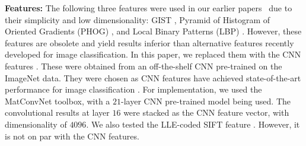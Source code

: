 









\textbf{Features:} The following three features were used in our
earlier papers~\citep{dai:eccv12b, dai:iccv13b} due to their simplicity and low dimensionality: GIST
\citep{gist}, Pyramid of Histogram of Oriented Gradients (PHOG)
\citep{Bosch:iccv07}, and Local Binary Patterns (LBP)
\citep{Ojala02}. However, these features are obsolete and yield
 results inferior than alternative features recently developed  for image
classification. 
In this paper, we replaced them with the CNN features \citep{caffe14, deep:bmvc14}. 
These were obtained from an off-the-shelf CNN pre-trained on the ImageNet data. 
They were chosen as CNN features
have achieved state-of-the-art performance for image classification
\citep{nips12:cnn, cnnfet14}. For implementation, we used the
MatConvNet \citep{MatConvNet} toolbox, with a $21$-layer CNN
pre-trained model being used. The convolutional results at layer $16$ were
stacked as the CNN feature vector, with dimensionality of $4096$.  We
also tested the LLE-coded SIFT feature \citep{siftllc:cvpr10}. However,
it is not on par with the CNN features.
 
